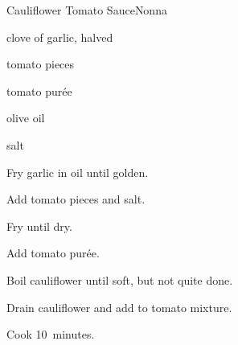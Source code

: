 \begin{recipe}{Cauliflower Tomato Sauce}{Nonna}{}

\begin{ingredients}
\item clove of garlic, halved
\item {}
\item tomato pieces
\item tomato pur\'ee
\item olive oil
\item salt
\end{ingredients}

\begin{directions}
\item Fry garlic in oil until golden.
\item Add tomato pieces and salt.
\item Fry until dry.
\item Add tomato pur\'ee.
\item Boil cauliflower until soft, but not quite done.
\item Drain cauliflower and add to tomato mixture.
\item Cook 10~minutes.
\end{directions}

\end{recipe}
